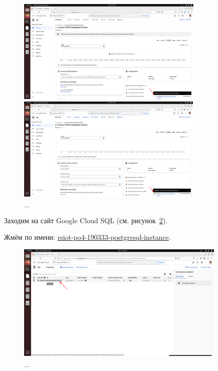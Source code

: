\documentclass[12pt, a4paper, simple]{eskdtext}
\begin{document}
  \begin{figure}[!h]
    \centering
  
    \begin{minipage}{0.49\textwidth}
      \centering
  
      \includegraphics[height=5cm]
      {images/2023-02-26_00-34-01.png}
  
      \caption{\_}
  
      \label{fig:26}
    \end{minipage}
    \begin{minipage}{0.49\textwidth}
      \centering
  
      \includegraphics[height=5cm]
      {images/2023-02-26_00-51-17.png}
  
      \caption{\_}
  
      \label{fig:27}
    \end{minipage}
  \end{figure}

  Заходим на сайт Google Cloud SQL \cite{GoogleCloudSql} (см. рисунок~\ref{fig:28}).

  Жмём по имени: \underline{rsiot-po4-190333-postgresql-instance}.
  \begin{figure}[!h]
    \centering
    \includegraphics[width=10cm]
    {images/2023-02-26_00-55-24.png}
    \caption{\_}
    \label{fig:28}
  \end{figure}
\end{document}
